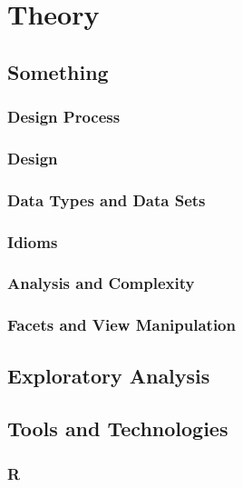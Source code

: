 \documentclass[a4paper,12pt]{article}
\begin{document}
\section{Theory} %

\subsection{Something} %
\subsubsection{Design Process} %
\subsubsection{Design} %

\subsubsection{Data Types and Data Sets} %

\subsubsection{Idioms} %

\subsubsection{Analysis and Complexity} %

\subsubsection{Facets and View Manipulation} %


\subsection{Exploratory Analysis} %

\subsection{Tools and Technologies} %
\subsubsection{R} %
\end{document}
